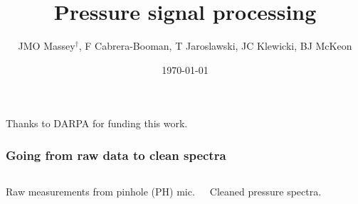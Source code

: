 \documentclass[aspectratio=169,10pt]{beamer}
\title{Pressure signal processing}
\author{JMO Massey$^{\dag}$, F Cabrera-Booman, T Jaroslawski, JC Klewicki, BJ McKeon}
\institute{Center for Turbulence Research \\ Stanford University}
\date{\today}
\begin{document}
\begin{frame}
    \setcounter{framenumber}{0}
    \titlepage
    \vfill
    {\scriptsize \centering Thanks to DARPA for funding this work.\par}
\end{frame}

\begin{frame}
  \frametitle{Going from raw data to clean spectra}
  \begin{columns}[c] %
        Raw measurements from pinhole (PH) mic.
    
      \centering
      \scalebox{3}{$\Longrightarrow$}
        Cleaned pressure spectra.
    
  \end{columns}
\end{frame}
\end{document}
